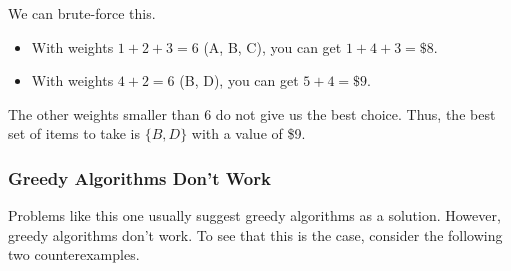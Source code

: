 \documentclass[letterpaper]{article}
\begin{document}
\begin{mdframed}[]
    We can brute-force this. 
    \begin{itemize}
        \item With weights $1 + 2 + 3 = 6$ (A, B, C), you can get $1 + 4 + 3 = \$8$. 
        \item With weights $4 + 2 = 6$ (B, D), you can get $5 + 4 = \$9$. 
    \end{itemize}
    The other weights smaller than 6 do not give us the best choice. Thus, the best set of items to take is $\{B, D\}$ with a value of \$9. 
\end{mdframed}


\subsubsection{Greedy Algorithms Don't Work}
Problems like this one usually suggest greedy algorithms as a solution. However, greedy algorithms don't work. To see that this is the case, consider the following two counterexamples.
\end{document}
